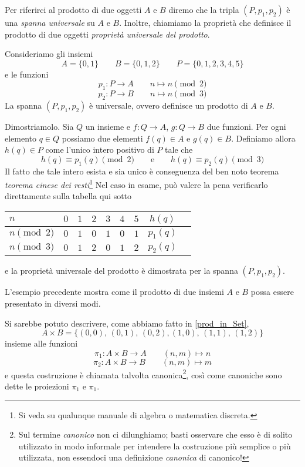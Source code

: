\medskip
Per riferirci al prodotto di due oggetti \(A\) e \(B\) diremo che la tripla \((P,p_1,p_2)\) è una \emph{spanna universale} su  \(A\) e \(B\). Inoltre, chiamiamo la proprietà che definisce il prodotto di due oggetti \emph{proprietà universale del prodotto}.

\begin{example}\label{esempio_spanna_universale_in_Set}
	Consideriamo gli insiemi
	\[
		A=\{0,1\}\qquad B=\{0,1,2\}\qquad P=\{0,1,2,3,4,5\}
	\]
	e le funzioni
	\[
		p_1\colon P\to A\qquad n\mapsto n\pmod 2
	\]
	\[
		p_2\colon P\to B\qquad n\mapsto n\pmod 3
	\]
	La spanna \((P, p_1, p_2)\) è universale, ovvero definisce un prodotto di \(A\) e \(B\).


Dimostriamolo. Sia \(Q\) un insieme e \(f\colon Q\to A\), \(g\colon Q\to B\) due funzioni. Per ogni elemento \(q\in Q\) possiamo due elementi \(f(q)\in A\) e \(g(q)\in B\). Definiamo allora \(h(q)\in P\) come l'unico intero positivo di \(P\) tale che 
\[
h(q)\equiv p_1(q) \pmod 2\qquad\text{e}\qquad h(q)\equiv p_2(q) \pmod 3
\]
Il fatto che tale intero esista e sia unico è conseguenza del ben noto teorema \emph{teorema cinese dei resti}\footnote{Si veda su qualunque manuale di algebra o matematica discreta.} Nel caso in esame, può valere la pena verificarlo direttamente sulla tabella qui sotto
\begin{center}
\begin{tabular}{|l|c|c|c|c|c|c|c|c|}
\hline
\(n\) & \(0\) & \(1\) & \(2\) & \(3\) & \(4\) & \(5\)& \(h(q)\) \\
\hline
\(n \pmod 2\) & \(0\) & \(1\) & \(0\) & \(1\) & \(0\) & \(1\) & \(p_1(q)\)\\
\hline
\(n \pmod 3\)  & \(0\)  & \(1\) & \(2\) & \(0\) & \(1\) & \(2\) & \(p_2(q)\)\\
\hline
\end{tabular} 	
\end{center}
e la proprietà universale del prodotto è dimostrata per la spanna \((P, p_1, p_2)\).
\end{example}
L'esempio precedente mostra come il prodotto di due insiemi \(A\) e \(B\) possa essere presentato in diversi modi.

Si sarebbe potuto descrivere, come abbiamo fatto  in \ref{prod_in_Set},
\[
	A\times B=\{(0,0),\,(0,1),\,(0,2),(1,0),\,(1,1),\,(1,2)\}
\]
insieme alle funzioni
\[
	\pi_1\colon A\times B\to A\qquad (n,m)\mapsto n
\]
\[
	\pi_2 \colon A\times B\to B\qquad (n,m)\mapsto m
\]
e questa costruzione è chiamata talvolta canonica\footnote{Sul termine \emph{canonico} non ci dilunghiamo; basti osservare che esso è di solito utilizzato in modo informale per intendere la costruzione più semplice o più utilizzata, non essendoci una definizione \emph{canonica} di canonico!}, così come canoniche sono dette le proiezioni \(\pi_1\) e \(\pi_1\).

